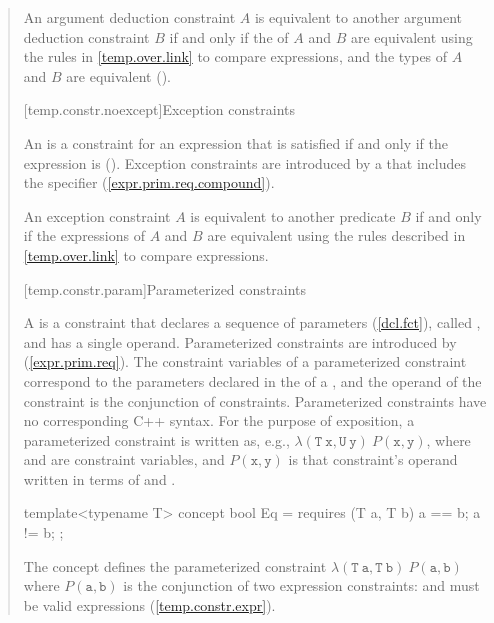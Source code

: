 \begin{quote}
\pnum
An argument deduction constraint $A$ is equivalent to another 
argument deduction constraint $B$ if and only if the 
 of $A$ and $B$ are equivalent
using the rules in \ref{temp.over.link} to compare expressions, and the types
of $A$ and $B$ are equivalent ().


[temp.constr.noexcept]{Exception constraints}

\pnum
An  is a constraint
for an expression  that is satisfied if and only
if the expression  is 
().
% 
\enternote
Exception constraints are introduced by a  
that includes the  specifier (\ref{expr.prim.req.compound}).
\exitnote

\pnum
An exception constraint $A$ is equivalent to another predicate
$B$ if and only if the expressions of $A$ and $B$ are equivalent using the 
rules described in \ref{temp.over.link} to compare expressions.


[temp.constr.param]{Parameterized constraints}

\pnum
A  is a constraint that declares a sequence
of parameters (\ref{dcl.fct}), called , and has a 
single operand. 
% 
\enternote
Parameterized constraints are introduced by 
 (\ref{expr.prim.req}). The constraint
variables of a parameterized constraint correspond to the 
parameters declared in the  of a
, and the operand of the constraint
is the conjunction of constraints.
\exitnote
% 
\enternote 
Parameterized constraints have no corresponding C++ syntax. For the purpose of 
exposition, a parameterized constraint is written as, e.g.,
$\lambda(\mathtt{T~x}, \mathtt{U~y})~P(\mathtt{x}, \mathtt{y})$, where 
 and  are constraint variables, and $P(\mathtt{x}, \mathtt{y})$ 
is that constraint's operand written in terms of  and .
\exitnote
% 
\enterexample
\begin{codeblock}
template<typename T>
  concept bool Eq = requires (T a, T b) {
    a == b;
    a != b;
  };
\end{codeblock}
The concept  defines the parameterized constraint
$\lambda(\mathtt{T~a}, \mathtt{T~b})~P(\mathtt{a}, \mathtt{b})$ where 
$P(\mathtt{a}, \mathtt{b})$ is the conjunction
of two expression constraints:  and  must be
valid expressions (\ref{temp.constr.expr}).
\exitexample


\end{quote}
